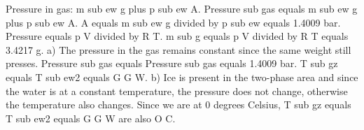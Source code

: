 Pressure in gas: m sub ew g plus p sub ew A.  
Pressure sub gas equals m sub ew g plus p sub ew A.  
A equals m sub ew g divided by p sub ew equals 1.4009 bar.  
Pressure equals p V divided by R T.  
m sub g equals p V divided by R T equals 3.4217 g.  
a) The pressure in the gas remains constant since the same weight still presses. Pressure sub gas equals Pressure sub gas equals 1.4009 bar.  
T sub gz equals T sub ew2 equals G G W.  
b) Ice is present in the two-phase area and since the water is at a constant temperature, the pressure does not change, otherwise the temperature also changes. Since we are at 0 degrees Celsius, T sub gz equals T sub ew2 equals G G W are also O C.